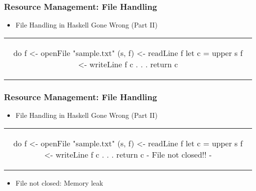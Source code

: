 \begin{frame}[fragile, c]
  \frametitle{Resource Management: File Handling}
  \begin{center}

  \begin{itemize}
  \item File Handling in Haskell Gone Wrong (Part II)
  \end{itemize}
  \begin{tabular}[h]{c}
    \begin{haskell}
    do f  <- openFile "sample.txt"
       (s, f)  <- readLine f
       let c = upper s
       f <- writeLine f c
           .
           .
           .
       return c
     \end{haskell}
  \end{tabular}

\end{center}
\end{frame}

\begin{frame}[fragile, c]
  \frametitle{Resource Management: File Handling}
  \begin{center}

  \begin{itemize}
  \item File Handling in Haskell Gone Wrong (Part II)
  \end{itemize}
  \begin{tabular}[h]{c}
    \begin{haskell}
    do f  <- openFile "sample.txt"
       (s, f)  <- readLine f
       let c = upper s
       f <- writeLine f c
           .
           .
           .
       return c {- File not closed!! -}
     \end{haskell}
  \end{tabular}
  \begin{itemize}
  \item File not closed: Memory leak
  \end{itemize}
  \end{center}
\end{frame}

